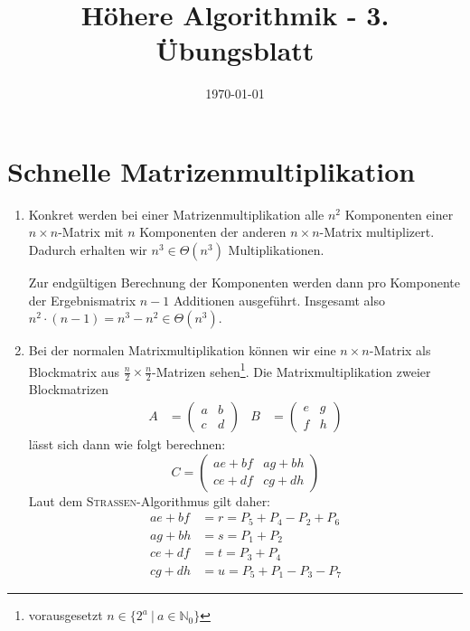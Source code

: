 \documentclass[a4paper,10pt]{scrartcl}
\title{H\"ohere Algorithmik - 3. \"Ubungsblatt}
\author{\Authors}
\date{\today}
\begin{document}
\maketitle

\section{Schnelle Matrizenmultiplikation}
\begin{enumerate}
\item   Konkret werden bei einer Matrizenmultiplikation alle $n^2$ Komponenten einer $n \times n$-Matrix mit $n$ Komponenten
        der anderen $n \times n$-Matrix multiplizert. Dadurch erhalten wir $n^3 \in \Theta(n^3)$ Multiplikationen.

        Zur endgültigen Berechnung der Komponenten werden dann pro Komponente der Ergebnismatrix $n-1$ Additionen ausgeführt.
        Insgesamt also $n^2 \cdot (n-1) = n^3 - n^2 \in \Theta(n^3)$.
        \item   Bei der normalen Matrixmultiplikation können wir eine $n \times n$-Matrix als Blockmatrix aus $\frac{n}{2}\times\frac{n}{2}$-Matrizen sehen\footnote{vorausgesetzt $n \in \{2^a\ |\ a \in \mathbb{N}_0\}$}. Die Matrixmultiplikation zweier Blockmatrizen
        \begin{align*}
         A &= \begin{pmatrix}
              a & b \\
              c & d
             \end{pmatrix} & 
         B &= \begin{pmatrix}
              e & g \\
              f & h
              \end{pmatrix}
        \end{align*}
        lässt sich dann wie folgt berechnen:
        \[
         C = \begin{pmatrix}
           ae + bf & ag + bh \\
           ce + df & cg + dh 
         \end{pmatrix}
        \]
        Laut dem \textsc{Strassen}-Algorithmus gilt daher:
        \begin{align}
         ae + bf &= r = P_5 + P_4 - P_2 + P_6  \label{matrix_r} \\
         ag + bh &= s = P_1 + P_2 \label{matrix_s}\\
         ce + df &= t = P_3 + P_4 \label{matrix_t}\\
         cg + dh &= u = P_5 + P_1 - P_3 - P_7 \label{matrix_u}

\end{align}
\end{enumerate}
\end{document}

